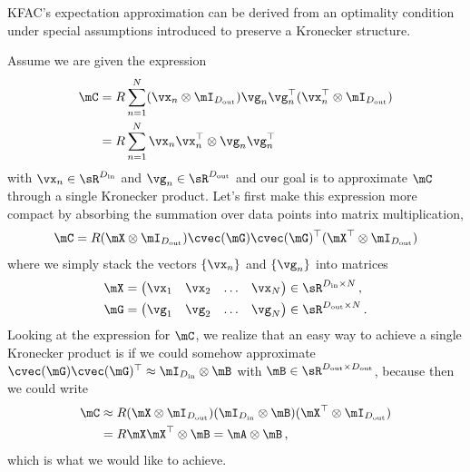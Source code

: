 \begin{example}
  KFAC's expectation approximation can be derived from an optimality condition under special assumptions introduced to preserve a Kronecker structure.

  Assume we are given the expression
  \begin{align*}
    \mC
    &=
      R \sum_{n=1}^N
      (\vx_n \otimes \mI_{D_{\text{out}}})
      \vg_n \vg_n^{\top}
      (\vx_n^{\top} \otimes \mI_{D_{\text{out}}})
    \\
    &=
      R \sum_{n=1}^N
      \vx_n \vx_n^{\top} \otimes \vg_n \vg_n^{\top}
  \end{align*}
  with $\vx_n \in \sR^{D_{\text{in}}}$ and $\vg_n \in \sR^{D_{\text{out}}}$ and our goal is to approximate $\mC$ through a single Kronecker product.
  Let's first make this expression more compact by absorbing the summation over data points into matrix multiplication,
  \begin{align*}
    \mC =
    R (\mX \otimes \mI_{D_{\text{out}}})
    \cvec(\mG) \cvec(\mG)^{\top}
    (\mX^{\top} \otimes \mI_{D_{\text{out}}})
  \end{align*}
  where we simply stack the vectors $\{ \vx_n \}$ and $\{\vg_n \}$ into matrices
  \begin{align*}
    \mX
    &=
      \begin{pmatrix}
        \vx_1 & \vx_2 & \ldots & \vx_N
      \end{pmatrix}
      \in \sR^{D_{\text{in}} \times N}\,,
    \\
    \mG
    &=
      \begin{pmatrix}
        \vg_1 & \vg_2 & \ldots & \vg_N
      \end{pmatrix}
      \in \sR^{D_{\text{out}} \times N}\,.
  \end{align*}
  Looking at the expression for $\mC$, we realize that an easy way to achieve a single Kronecker product is if we could somehow approximate $\cvec(\mG) \cvec(\mG)^{\top} \approx \mI_{D_{\text{in}}} \otimes \mB$ with $\mB \in \sR^{D_{\text{out}}\times D_{\text{out}}}$, because then we could write
  \begin{align*}
    \mC
    &\approx
      R (\mX \otimes \mI_{D_{\text{out}}})
      (\mI_{D_{\text{in}}} \otimes \mB)
      (\mX^{\top} \otimes \mI_{D_{\text{out}}})
    \\
    &=
      R \mX \mX^{\top} \otimes \mB
      =
      \mA \otimes \mB\,,
  \end{align*}
  which is what we would like to achieve.


\end{example}
